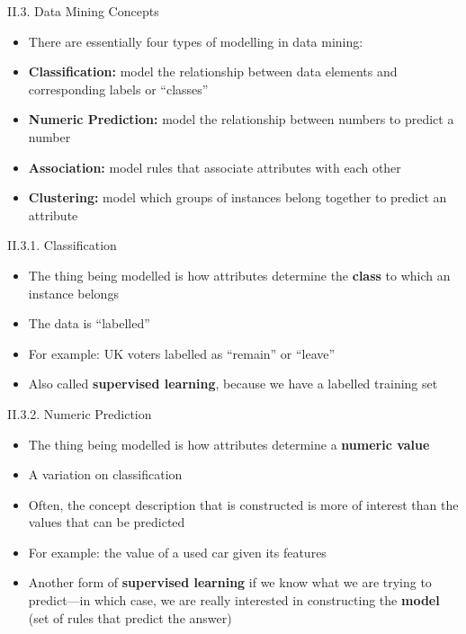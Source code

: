 \documentclass[handout]{beamer}
\newcommand{\strong}[1]{\textbf{\color{teal} #1}}
\newcommand{\stronger}[1]{\textbf{\color{purple} #1}}
\begin{document}
\begin{frame}{II.3. Data Mining Concepts}
\begin{itemize}
\item[] There are essentially four types of modelling in data mining:
\item[1.] \stronger{Classification:} model the relationship between data elements and corresponding labels or ``classes''
\item[2.] \stronger{Numeric Prediction:} model the relationship between numbers to predict a number
\item[3.] \stronger{Association:} model rules that associate attributes with each other \item[4.] \stronger{Clustering:} model which groups of instances belong together
to predict an attribute
\end{itemize}
\end{frame}
\begin{frame}{II.3.1. Classification}
\begin{itemize}
\item The thing being modelled is how attributes determine the \strong{class} to which an instance belongs
\item The data is ``labelled''
\item For example: UK voters labelled as ``remain'' or ``leave''
\item Also called \strong{supervised learning}, because we have a labelled training set
\end{itemize}
\end{frame}
\begin{frame}{II.3.2. Numeric Prediction}
\begin{itemize}
\item The thing being modelled is how attributes determine a \strong{numeric value}
\item A variation on classification
\item Often, the concept description that is constructed is more of interest than the values that can be predicted
\item For example: the value of a used car given its features
\item Another form of \strong{supervised learning} if we know what we are trying to predict---in which case, we are really interested in constructing the \strong{model} (set of rules that predict the answer)
\end{itemize}
\end{frame}
\end{document}
